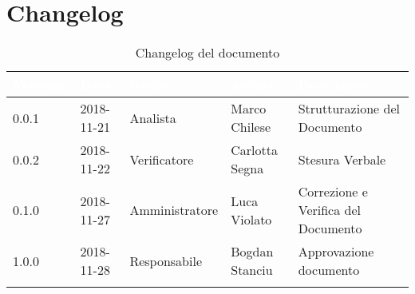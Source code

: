 \newpage

\section{Changelog}

\begin{center}
\begin{longtable}[c]{|m{}|m{}|m{}|m{}|p{}|}
\hline
\rowcolor{bluelogo}\textbf{\textcolor{white}{Versione}} & \textbf{\textcolor{white}{Data}} & \textbf{\textcolor{white}{Ruolo}} & \textbf{\textcolor{white}{Autore}} & \textbf{\textcolor{white}{Descrizione}}\\
\hline \hline
\endfirsthead
0.0.1 & 2018-11-21 & Analista & Marco Chilese & Strutturazione del Documento \\
\rowcolor{grigio} 0.0.2 & 2018-11-22 & Verificatore &Carlotta Segna  & Stesura Verbale \\
\hline
0.1.0 & 2018-11-27 & Amministratore &Luca Violato & Correzione e Verifica del Documento\\
\hline
\rowcolor{grigio} 1.0.0 & 2018-11-28 & Responsabile  & Bogdan Stanciu & Approvazione documento\\
\caption{Changelog del documento}
\end{longtable}
\end{center}
